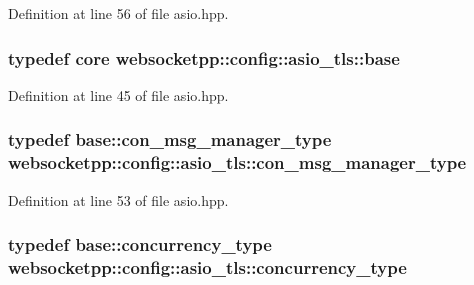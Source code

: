 Definition at line 56 of file asio.\+hpp.

\hypertarget{structwebsocketpp_1_1config_1_1asio__tls_ad3e689ff15338d7bb3647e9af27d4f2f}{}
\subsubsection[{base}]{\setlength{\rightskip}{0pt plus 5cm}typedef {\bf core} {\bf websocketpp\+::config\+::asio\+\_\+tls\+::base}}\label{structwebsocketpp_1_1config_1_1asio__tls_ad3e689ff15338d7bb3647e9af27d4f2f}


Definition at line 45 of file asio.\+hpp.

\hypertarget{structwebsocketpp_1_1config_1_1asio__tls_add8c7b91ce5f365d76f1d53b37002cc9}{}
\subsubsection[{con\+\_\+msg\+\_\+manager\+\_\+type}]{\setlength{\rightskip}{0pt plus 5cm}typedef {\bf base\+::con\+\_\+msg\+\_\+manager\+\_\+type} {\bf websocketpp\+::config\+::asio\+\_\+tls\+::con\+\_\+msg\+\_\+manager\+\_\+type}}\label{structwebsocketpp_1_1config_1_1asio__tls_add8c7b91ce5f365d76f1d53b37002cc9}


Definition at line 53 of file asio.\+hpp.

\hypertarget{structwebsocketpp_1_1config_1_1asio__tls_a94dbb7a141044dbc99de282fdeb560d8}{}
\subsubsection[{concurrency\+\_\+type}]{\setlength{\rightskip}{0pt plus 5cm}typedef {\bf base\+::concurrency\+\_\+type} {\bf websocketpp\+::config\+::asio\+\_\+tls\+::concurrency\+\_\+type}}\label{structwebsocketpp_1_1config_1_1asio__tls_a94dbb7a141044dbc99de282fdeb560d8}


